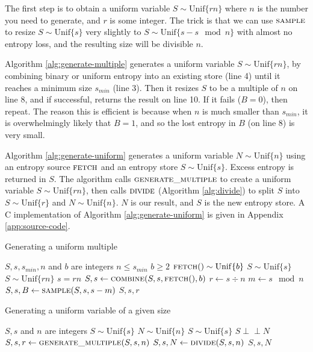 \documentclass[lettersize,onecolumn]{IEEEtran}
\newcommand{\indep}{\perp\!\!\!\perp}
\newcommand{\unif}[1]{\mathrm{Unif}\{#1\}}
\begin{document}
The first step is to obtain a uniform variable $S \sim \unif{rn}$ where $n$ is the number you need to generate, and $r$ is some integer. The trick is that we can use $\textsc{sample}$ to resize $S \sim \unif{s}$ very slightly to $S \sim \unif{s - s \mod n}$ with almost no entropy loss, and the resulting size will be divisible $n$.

Algorithm \ref{alg:generate-multiple} generates a uniform variable $S \sim \unif{rn}$, by combining binary or uniform entropy into an existing store (line 4) until it reaches a minimum size $s_{min}$ (line 3). Then it resizes $S$ to be a multiple of $n$ on line 8, and if successful, returns the result on line 10. If it fails ($B=0$), then repeat. The reason this is efficient is because when $n$ is much smaller than $s_{min}$, it is overwhelmingly likely that $B=1$, and so the lost entropy in $B$ (on line 8) is very small.

Algorithm \ref{alg:generate-uniform} generates a uniform variable $N \sim \unif{n}$ using an entropy source $\textsc{fetch}$ and an entropy store $S \sim \unif{s}$. Excess entropy is returned in $S$. The algorithm calls $\textsc{generate\_multiple}$ to create a uniform variable $S \sim \unif{rn}$, then calls $\textsc{divide}$ (Algorithm \ref{alg:divide}) to split $S$ into $S \sim \unif{r}$ and $N \sim \unif{n}$. $N$ is our result, and $S$ is the new entropy store. A C implementation of Algorithm \ref{alg:generate-uniform} is given in Appendix \ref{app:source-code}.

\begin{algorithm}
\caption{Generating a uniform multiple}
\label{alg:generate-multiple}
\begin{algorithmic}[1]
\Require $S, s, s_{min}, n$ and $b$ are integers
\Require $n \le s_{min}$
\Require $b \ge 2$
\Require $\textsc{fetch}() \sim \unif{b}$
\Require $S \sim \unif{s}$
\Ensure $S \sim \unif{rn}$
\Ensure $s = rn$
        \State $S, s \gets \textsc{combine}(S, s, \textsc{fetch}(), b)$
    \EndWhile
    \State $r \gets s \div n$
    \State $m \gets s \mod n$
    \State $S, s, B \gets \textsc{sample}(S, s, s-m)$ 
        \State \Return $S, s, r$
    \EndIf
  \EndWhile
\EndProcedure
\end{algorithmic}
\end{algorithm}

\begin{algorithm}
\caption{Generating a uniform variable of a given size}
\label{alg:generate-uniform}
\begin{algorithmic}[1]
\Require $S, s$ and $n$ are integers
\Require $S \sim \unif{s}$
\Ensure $N \sim \unif{n}$
\Ensure $S \sim \unif{s}$
\Ensure $S \indep N$
  \State $S, s, r \gets \textsc{generate\_multiple}(S, s, n)$
  \State $S, s, N \gets \textsc{divide}(S, s, n)$
  \State \Return $S, s, N$
\EndProcedure
\end{algorithmic}
\end{algorithm}
\end{document}
